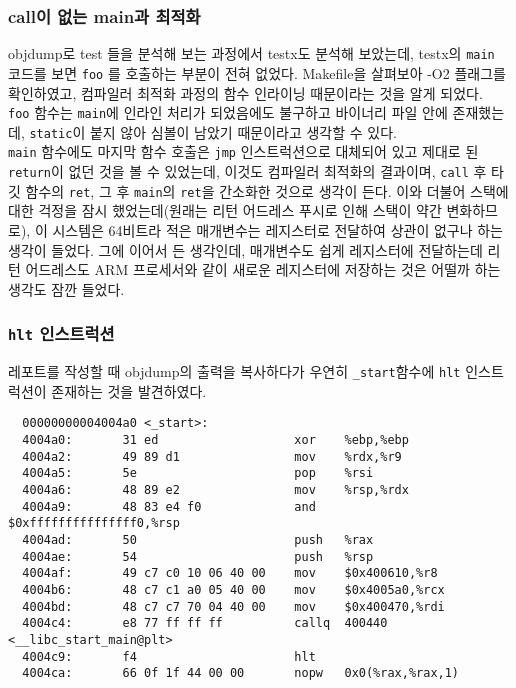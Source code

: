 \documentclass{report}
\begin{document}
\subsubsection{call이 없는 main과 최적화}
objdump로 test 들을 분석해 보는 과정에서 testx도 분석해 보았는데, testx의 \lstinline{main} 코드를 보면 \lstinline{foo} 를 호출하는 부분이 전혀 없었다. Makefile을 살펴보아 -O2 플래그를 확인하였고, 컴파일러 최적화 과정의 함수 인라이닝 때문이라는 것을 알게 되었다.
\\
\lstinline{foo} 함수는 \lstinline{main}에 인라인 처리가 되었음에도 불구하고 바이너리 파일 안에 존재했는데, \lstinline{static}이 붙지 않아 심볼이 남았기 때문이라고 생각할 수 있다.
\\
\lstinline{main} 함수에도 마지막 함수 호출은 \lstinline{jmp} 인스트럭션으로 대체되어 있고 제대로 된 \lstinline{return}이 없던 것을 볼 수 있었는데, 이것도 컴파일러 최적화의 결과이며, \lstinline{call} 후 타깃 함수의 \lstinline{ret}, 그 후 \lstinline{main}의 \lstinline{ret}을 간소화한 것으로 생각이 든다. 이와 더불어 스택에 대한 걱정을 잠시 했었는데(원래는 리턴 어드레스 푸시로 인해 스택이 약간 변화하므로), 이 시스템은 64비트라 적은 매개변수는 레지스터로 전달하여 상관이 없구나 하는 생각이 들었다. 그에 이어서 든 생각인데, 매개변수도 쉽게 레지스터에 전달하는데 리턴 어드레스도 ARM 프로세서와 같이 새로운 레지스터에 저장하는 것은 어떨까 하는 생각도 잠깐 들었다.

\subsubsection{\lstinline{hlt} 인스트럭션}
레포트를 작성할 때 objdump의 출력을 복사하다가 우연히 \lstinline{_start}함수에 \lstinline{hlt} 인스트럭션이 존재하는 것을 발견하였다.
\begin{verbatim}
  00000000004004a0 <_start>:
  4004a0:       31 ed                   xor    %ebp,%ebp
  4004a2:       49 89 d1                mov    %rdx,%r9
  4004a5:       5e                      pop    %rsi
  4004a6:       48 89 e2                mov    %rsp,%rdx
  4004a9:       48 83 e4 f0             and    $0xfffffffffffffff0,%rsp
  4004ad:       50                      push   %rax
  4004ae:       54                      push   %rsp
  4004af:       49 c7 c0 10 06 40 00    mov    $0x400610,%r8
  4004b6:       48 c7 c1 a0 05 40 00    mov    $0x4005a0,%rcx
  4004bd:       48 c7 c7 70 04 40 00    mov    $0x400470,%rdi
  4004c4:       e8 77 ff ff ff          callq  400440 <__libc_start_main@plt>
  4004c9:       f4                      hlt
  4004ca:       66 0f 1f 44 00 00       nopw   0x0(%rax,%rax,1)
\end{verbatim}
\end{document}
